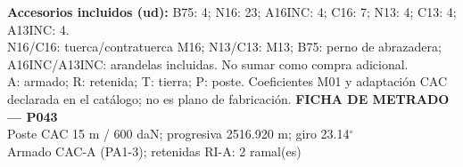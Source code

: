 \begingroup\scriptsize
\textbf{Accesorios incluidos (ud):} B75: 4; N16: 23; A16INC: 4; C16: 7; N13: 4; C13: 4; A13INC: 4.\\
N16/C16: tuerca/contratuerca M16; N13/C13: M13; B75: perno de abrazadera; A16INC/A13INC: arandelas incluidas. No sumar como compra adicional.\\
A: armado; R: retenida; T: tierra; P: poste. Coeficientes M01 y adaptación CAC declarada en el catálogo; no es plano de fabricación.
\endgroup\endgroup
\clearpage{}
\begingroup\small\setlength{\parskip}{3pt}\renewcommand{\arraystretch}{1.05}
\textbf{\large FICHA DE METRADO — P043}\\[4pt]
Poste CAC 15 m / 600 daN; progresiva 2516.920 m; giro 23.14\ensuremath{^\circ}\\
Armado CAC-A (PA1-3); retenidas RI-A: 2 ramal(es)\\
\begingroup\scriptsize
